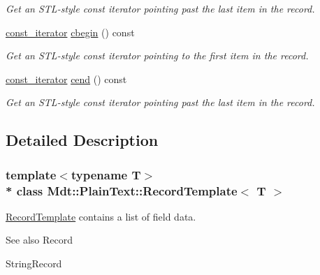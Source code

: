 \begin{DoxyCompactItemize}
\begin{DoxyCompactList}\small\item\em Get an S\+T\+L-\/style const iterator pointing past the last item in the record. \end{DoxyCompactList}\item 
\hyperlink{class_mdt_1_1_plain_text_1_1_record_template_a3c5cf577c8412857077b2a1f9088c1ae}{const\+\_\+iterator} \hyperlink{class_mdt_1_1_plain_text_1_1_record_template_ac1e301877a9cc656b434181e685075d8}{cbegin} () const \hypertarget{class_mdt_1_1_plain_text_1_1_record_template_ac1e301877a9cc656b434181e685075d8}{}\label{class_mdt_1_1_plain_text_1_1_record_template_ac1e301877a9cc656b434181e685075d8}

\begin{DoxyCompactList}\small\item\em Get an S\+T\+L-\/style const iterator pointing to the first item in the record. \end{DoxyCompactList}\item 
\hyperlink{class_mdt_1_1_plain_text_1_1_record_template_a3c5cf577c8412857077b2a1f9088c1ae}{const\+\_\+iterator} \hyperlink{class_mdt_1_1_plain_text_1_1_record_template_a2090e146d52a7f21df541720b6b3619d}{cend} () const \hypertarget{class_mdt_1_1_plain_text_1_1_record_template_a2090e146d52a7f21df541720b6b3619d}{}\label{class_mdt_1_1_plain_text_1_1_record_template_a2090e146d52a7f21df541720b6b3619d}

\begin{DoxyCompactList}\small\item\em Get an S\+T\+L-\/style const iterator pointing past the last item in the record. \end{DoxyCompactList}\end{DoxyCompactItemize}


\subsection{Detailed Description}
\subsubsection*{template$<$typename T$>$\\*
class Mdt\+::\+Plain\+Text\+::\+Record\+Template$<$ T $>$}

\hyperlink{class_mdt_1_1_plain_text_1_1_record_template}{Record\+Template} contains a list of field data. 

\begin{DoxySeeAlso}{See also}
Record 

String\+Record 
\end{DoxySeeAlso}


